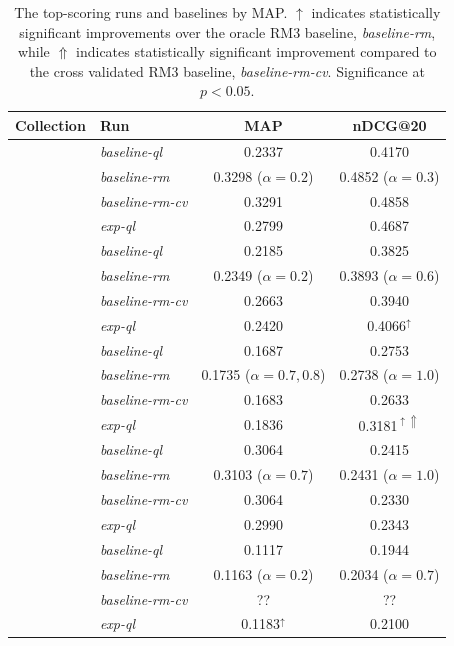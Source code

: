\documentclass{article}
\begin{document}
\begin{table}[htbp]
\centering
\begin{tabular}{|c|l|c|c|} \hline
{\bf Collection} & {\bf Run} & {\bf MAP} & {\bf nDCG@20} \\ \hline\hline
\rule{0pt}{2.5ex} \multirow{3}{*}{AP} & {\it baseline-ql} & 0.2337 & 0.4170 \\ \cline{2-4}
\rule{0pt}{2.5ex} & {\it baseline-rm} & 0.3298 ($\alpha=0.2$) & 0.4852 ($\alpha=0.3$) \\ \cline{2-4}
\rule{0pt}{2.5ex} & {\it baseline-rm-cv} & 0.3291 & 0.4858 \\ \cline{2-4}
\rule{0pt}{2.5ex} & {\it exp-ql} & 0.2799 & 0.4687 \\ \hline\hline
\rule{0pt}{2.5ex} \multirow{3}{*}{Robust} & {\it baseline-ql} & 0.2185 & 0.3825 \\ \cline{2-4}
\rule{0pt}{2.5ex} & {\it baseline-rm} & 0.2349 ($\alpha=0.2$) & 0.3893 ($\alpha=0.6$) \\ \cline{2-4}
\rule{0pt}{2.5ex} & {\it baseline-rm-cv} & 0.2663 & 0.3940 \\ \cline{2-4}
\rule{0pt}{2.5ex} & {\it exp-ql} & 0.2420 & 0.4066$^{\uparrow}$ \\ \hline\hline
\rule{0pt}{2.5ex} \multirow{3}{*}{wt10g} & {\it baseline-ql} & 0.1687 & 0.2753 \\ \cline{2-4}
\rule{0pt}{2.5ex} & {\it baseline-rm} & 0.1735 ($\alpha=0.7,0.8$) & 0.2738 ($\alpha=1.0$)\\ \cline{2-4}
\rule{0pt}{2.5ex} & {\it baseline-rm-cv} & 0.1683 & 0.2633 \\ \cline{2-4}
\rule{0pt}{2.5ex} & {\it exp-ql} & 0.1836 & 0.3181$^{\uparrow\Uparrow}$ \\ \hline\hline
\rule{0pt}{2.5ex} \multirow{3}{*}{blogs06} & {\it baseline-ql} & 0.3064 & 0.2415 \\ \cline{2-4}
\rule{0pt}{2.5ex} & {\it baseline-rm} & 0.3103 ($\alpha=0.7$) & 0.2431 ($\alpha=1.0$)\\ \cline{2-4}
\rule{0pt}{2.5ex} & {\it baseline-rm-cv} & 0.3064 & 0.2330 \\ \cline{2-4}
\rule{0pt}{2.5ex} & {\it exp-ql} & 0.2990 & 0.2343 \\ \hline\hline
\rule{0pt}{2.5ex} \multirow{3}{*}{clueweb09} & {\it baseline-ql} & 0.1117 & 0.1944 \\ \cline{2-4}
\rule{0pt}{2.5ex} & {\it baseline-rm} & 0.1163 ($\alpha=0.2$) & 0.2034 ($\alpha=0.7$) \\ \cline{2-4}
\rule{0pt}{2.5ex} & {\it baseline-rm-cv} & ?? & ?? \\ \cline{2-4}
\rule{0pt}{2.5ex} & {\it exp-ql} & 0.1183$^{\uparrow}$ & 0.2100 \\ \hline
\end{tabular}
\caption{The top-scoring runs and baselines by MAP. $\uparrow$ indicates statistically significant improvements over the oracle RM3 baseline, \textit{baseline-rm}, while $\Uparrow$ indicates statistically significant improvement compared to the cross validated RM3 baseline, \textit{baseline-rm-cv}. Significance at $p < 0.05$.}
\label{table.performance}
\end{table}
\end{document}
